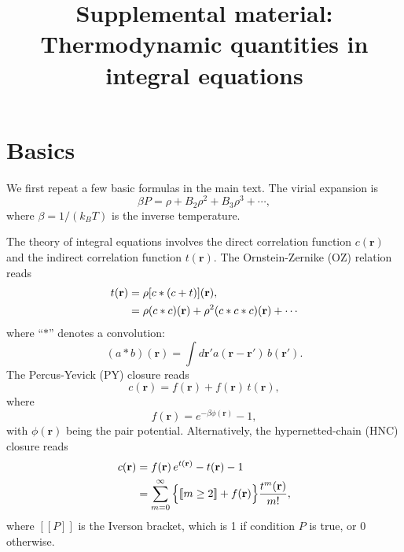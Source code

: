 \documentclass[notitlepage,preprint]{revtex4-1}
\newcommand{\vct}[1]{\mathbf{#1}}
\providecommand{\vr}{} %
\renewcommand{\vr}{\vct{r}}
\newcommand{\llbra}{[\![}
\newcommand{\llket}{]\!]}
\begin{document}
\title{Supplemental material: Thermodynamic quantities in integral equations}


\maketitle






\section{Basics}

We first repeat a few basic formulas in the main text.
%
The virial expansion is
%
\begin{equation}
  \beta P = \rho + B_2 \rho^2 + B_3 \rho^3 + \cdots,
\label{eq:virial}
\end{equation}
%
where $\beta = 1/(k_B T)$ is the inverse temperature.

The theory of integral equations involves
  the direct correlation function $c(\vr)$
  and the indirect correlation function $t(\vr)$.
%
The Ornstein-Zernike (OZ) relation\cite{hansen} reads
%
\begin{align}
  t(\vr) &= \rho [c * (c + t)](\vr), \notag \\
         &= \rho (c*c)(\vr) + \rho^2 (c*c*c)(\vr) + \cdots
\label{eq:oz}
\end{align}
%
where ``$*$'' denotes a convolution:
\begin{equation}
  (a * b)(\vr) = \int d\vr' a(\vr - \vr') \, b(\vr').
\label{eq:convol}
\end{equation}
%
The Percus-Yevick (PY) closure\cite{percusyevick} reads
%
\begin{equation}
  c(\vr) = f(\vr) + f(\vr) \, t(\vr),
  \label{eq:py}
\end{equation}
where
\begin{equation}
  f(\vr) = e^{-\beta \phi(\vr)} - 1,
  \label{eq:fbond}
\end{equation}
with $\phi(\vr)$ being the pair potential.
%
Alternatively, the hypernetted-chain (HNC) closure\cite{
morita1958, *morita1959, *morita1960} reads
%
\begin{align}
  c(\vr) &= f(\vr) \, e^{t(\vr)} - t(\vr) - 1 \notag \\
         &= \sum_{m=0}^\infty
                \Big\{ \llbra m \ge 2 \llket + f(\vr) \Big\}
                \frac{ t^m(\vr) }{ m! },
  \label{eq:hnc}
\end{align}
%
where $\llbra P \llket$ is the Iverson bracket, which is 1 if condition $P$ is true, or 0 otherwise.
\end{document}
